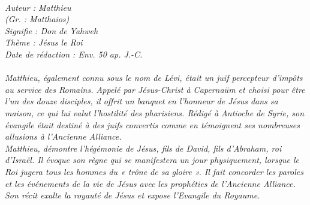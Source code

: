 \BFont
\noindent\hrulefill
{\footnotesize
\textit{
\bigskip
{\centering{}
\\Auteur : Matthieu
\\(Gr. : Matthaios)
\\Signifie : Don de Yahweh
\\Thème : Jésus le Roi
\\Date de rédaction : Env. 50 ap. J.-C.\\}
}
\textit{
\\Matthieu, également connu sous le nom de Lévi, était un juif percepteur d'impôts au service des Romains. Appelé par
Jésus-Christ à Capernaüm et choisi pour être l'un des douze disciples, il offrit un banquet en l'honneur de Jésus dans
sa maison, ce qui lui valut l'hostilité des pharisiens. Rédigé à Antioche de Syrie, son évangile était destiné à des juifs
convertis comme en témoignent ses nombreuses allusions à l'Ancienne Alliance.
\\Matthieu, démontre l'hégémonie de Jésus, fils de David, fils d'Abraham, roi d'Israël. Il évoque son règne qui se manifestera un jour physiquement, lorsque le Roi jugera tous les hommes du « trône de sa gloire ». Il fait concorder les paroles et les événements de la vie de Jésus avec les prophéties de l'Ancienne Alliance.
\\Son récit exalte la royauté de Jésus et expose l'Evangile du Royaume.\bigskip
}
}
\par\nobreak\noindent\hrulefill
